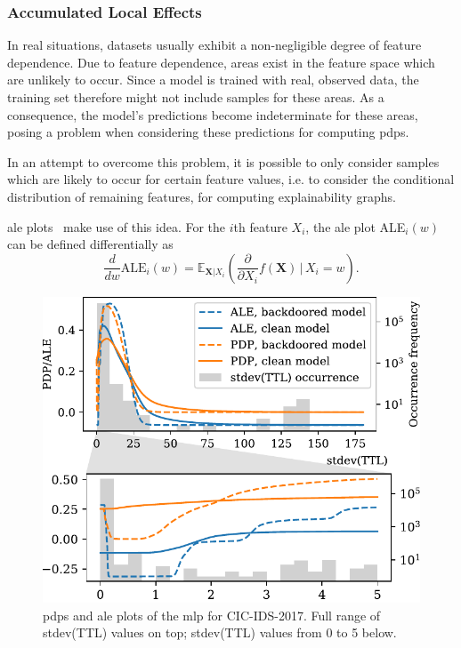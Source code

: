 \documentclass[9pt,sigconf,letterpaper,dvipsnames\ifx\removeHeaders\tempYes ,nonacm\fi]{acmart}
\newcommand\note[2]{{\color{#1}#2}}
\newcommand\todo[1]{{\note{red}{TODO: #1}}}
\newcommand{\cic}{CIC-IDS-2017}
\begin{document}
\subsubsection{Accumulated Local Effects}
In real situations, datasets usually exhibit a non-negligible degree of feature dependence. 
Due to feature dependence,
 areas exist in the feature space which are  unlikely
to occur. Since a model is trained with real, observed data, the training set therefore might not include samples for these areas.
As a consequence,
the model's predictions become indeterminate for these areas, %
posing a
problem when considering these predictions for computing \glspl{pdp}.

In an attempt to overcome this problem, it is possible to only consider samples which are likely to occur for certain feature values, i.e. to consider the conditional distribution of remaining features, for computing explainability graphs.

\gls{ale} plots~\cite{apley_visualizing_2016} make use of this idea.
For the $i$th feature $X_i$, the \gls{ale} plot ALE$_i(w)$ can be defined differentially as
\begin{equation}
\frac{d}{dw} \text{ALE}_i (w) = \mathbb E_{\boldsymbol X | X_i}\left(\frac{\partial}{\partial X_i} f(\boldsymbol X) \, \Big \vert \, X_i=w\right) .
\end{equation}


\begin{figure}[b!]
\includegraphics[width=\columnwidth]{figures/pdpale2017nn_joint_2.pdf}

\caption{\glspl{pdp} and \gls{ale} plots of the \gls{mlp} for \cic{}. Full range of stdev(TTL) values on top; stdev(TTL) values from 0 to 5 below.}
\label{fig:pdp_ttl}
\end{figure}
\end{document}

